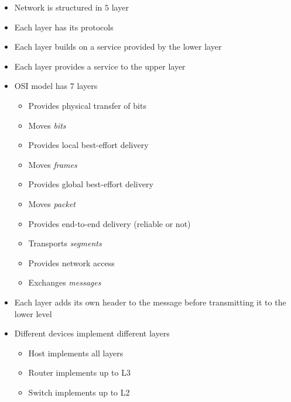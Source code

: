 \begin{itemize}
    \item Network is structured in $5$ layer
    \item Each layer has its protocols
    \item Each layer builds on a service provided by the lower layer
    \item Each layer provides a service to the upper layer
    \item OSI model has $7$ layers
        \begin{itemize}
            \item Provides physical transfer of bits
            \item Moves \textit{bits}
        \end{itemize}
        \begin{itemize}
            \item Provides local best-effort delivery
            \item Moves \textit{frames}
        \end{itemize}
        \begin{itemize}
            \item Provides global best-effort delivery
            \item Moves \textit{packet}
        \end{itemize}
        \begin{itemize}
            \item Provides end-to-end delivery (reliable or not)
            \item Transports \textit{segments}
        \end{itemize}
        \begin{itemize}
            \item Provides network access
            \item Exchanges \textit{messages}
        \end{itemize}
    \item Each layer adds its own header to the message before transmitting it to the lower level
    \item Different devices implement different layers
        \begin{itemize}
            \item Host implements all layers
            \item Router implements up to L3
            \item Switch implements up to L2
        \end{itemize}
\end{itemize}

